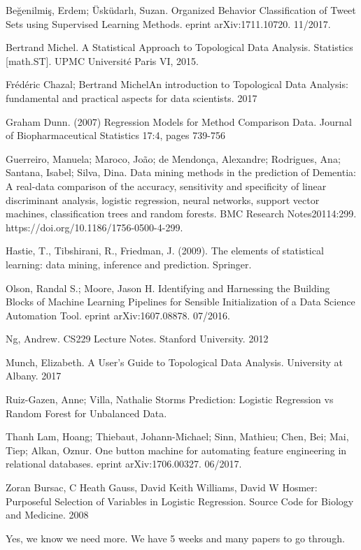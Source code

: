 \documentclass{llncs}
\begin{document}
\newpage
\begin{thebibliography}{9}

Beğenilmiş, Erdem; Üsküdarlı, Suzan.  Organized Behavior Classification of Tweet Sets using Supervised Learning Methods. eprint arXiv:1711.10720. 11/2017.

Bertrand Michel. A Statistical Approach to Topological Data Analysis. Statistics [math.ST]. UPMC Université Paris VI, 2015.

Frédéric Chazal; Bertrand MichelAn introduction to Topological Data Analysis: fundamental and practical aspects for data scientists. 2017

Graham Dunn. (2007) Regression Models for Method Comparison Data. Journal of Biopharmaceutical Statistics 17:4, pages 739-756

Guerreiro, Manuela; Maroco, João; de Mendonça, Alexandre; Rodrigues, Ana; Santana, Isabel; Silva, Dina. Data mining methods in the prediction of Dementia: A real-data comparison of the accuracy, sensitivity and specificity of linear discriminant analysis, logistic regression, neural networks, support vector machines, classification trees and random forests. BMC Research Notes20114:299. https://doi.org/10.1186/1756-0500-4-299.

Hastie, T., Tibshirani, R., Friedman, J. (2009). The elements of statistical learning: data mining, inference and prediction. Springer. 

Olson, Randal S.; Moore, Jason H.  Identifying and Harnessing the Building Blocks of Machine Learning Pipelines for Sensible Initialization of a Data Science Automation Tool. eprint arXiv:1607.08878. 07/2016. 

Ng, Andrew. CS229 Lecture Notes. Stanford University. 2012

Munch, Elizabeth. A User’s Guide to Topological Data Analysis. University at Albany. 2017

Ruiz-Gazen, Anne; Villa, Nathalie Storms Prediction: Logistic Regression vs Random Forest for Unbalanced Data.

Thanh Lam, Hoang; Thiebaut, Johann-Michael; Sinn, Mathieu; Chen, Bei; Mai, Tiep; Alkan, Oznur.  One button machine for automating feature engineering in relational databases. eprint arXiv:1706.00327. 06/2017.

Zoran Bursac, C Heath Gauss, David Keith Williams, David W Hosmer: Purposeful Selection of Variables in Logistic Regression. Source Code for Biology and Medicine. 2008

\end{thebibliography}

Yes, we know we need more.  We have 5 weeks and many papers to go through.
\end{document}
